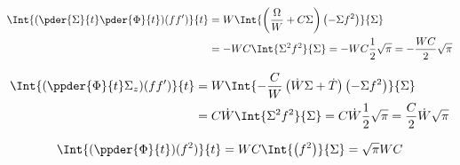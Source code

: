 \begin{equation}
\begin{split}
\Int{ (\pder{\Sigma}{t} \pder{\Phi}{t}) (ff')}{t}  &= W \Int{ \left(\frac{\Omega}{W} + C \Sigma\right) \left(-\Sigma f^2\right) }{\Sigma}\\
&= -W C\Int{\Sigma^2 f^2}{\Sigma} = -W C \frac{1}{2}\sqrt{\pi}  = -\frac{WC}{2}\sqrt{\pi} \\
\end{split}
\end{equation}

\begin{equation}
\begin{split}
\Int{ (\ppder{\Phi}{t} \Sigma_{z}) (ff') }{t}  &= W \Int{ -\frac{C}{W} \left(\dot{W}\Sigma  +\dot{T} \right) \left(-\Sigma f^2\right)}{\Sigma}\\
&= C\dot{W}\Int{\Sigma^2 f^2}{\Sigma} =  C\dot{W} \frac{1}{2}\sqrt{\pi} = \frac{C}{2}\dot{W} \sqrt{\pi} \\
\end{split}
\end{equation}

\begin{equation}
\begin{split}
\Int{ ( \ppder{\Phi}{t}) (f^2) }{t}  &= WC \Int{\left( f^2\right)}{\Sigma} = \sqrt{\pi}WC\\
\end{split}
\end{equation}

